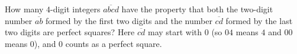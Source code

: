 How many $4$-digit integers $\overline{abcd}$ have the property that both the two-digit number $\overline{ab}$ formed by the first two digits and the number $\overline{cd}$ formed by the last two digits are perfect squares? Here $\overline{cd}$ may start with $0$ (so $04$ means $4$ and $00$ means $0$), and $0$ counts as a perfect square.
